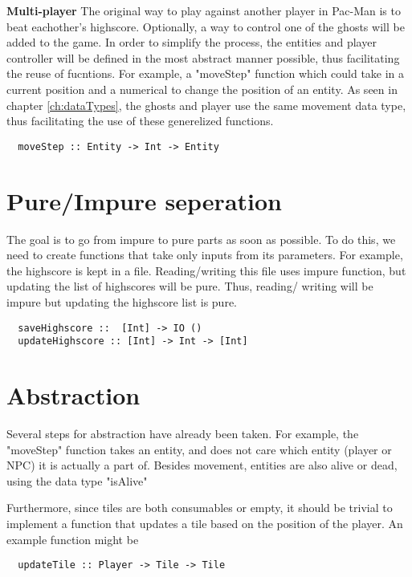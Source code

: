 \documentclass[11pt]{Article}
\begin{document}
\textbf{Multi-player} The original way to play against another player in Pac-Man is to beat eachother's highscore. Optionally, a way to control one of the ghosts will be added to the game. In order to simplify the process, the entities and player controller will be defined in the most abstract manner possible, thus facilitating the reuse of fucntions. For example, a "moveStep" function which could take in a current position and a numerical to change the position of an entity. As seen in chapter \ref{ch:dataTypes}, the ghosts and player use the same movement data type, thus facilitating the use of these generelized functions.

\begin{lstlisting}
  moveStep :: Entity -> Int -> Entity
\end{lstlisting}


\section{Pure/Impure seperation} \label{ch:pureSeperation}
The goal is to go from impure to pure parts as soon as possible. To do this, we need to create functions that take only inputs from its parameters. For example, the highscore is kept in a file. Reading/writing this file uses impure function, but updating the list of highscores will be pure. Thus, reading/ writing will be impure but updating the highscore list is pure.

\begin{lstlisting}
  saveHighscore ::  [Int] -> IO ()
  updateHighscore :: [Int] -> Int -> [Int]
\end{lstlisting}

\section{Abstraction} \label{ch:abstraction}
Several steps for abstraction have already been taken. For example, the "moveStep" function takes an entity, and does not care which entity (player or NPC) it is actually a part of. Besides movement, entities are also alive or dead, using the data type "isAlive" 

Furthermore, since tiles are both consumables or empty, it should be trivial to implement a function that updates a tile based on the position of the player. An example function might be

\begin{lstlisting}
  updateTile :: Player -> Tile -> Tile
\end{lstlisting}
\end{document}
